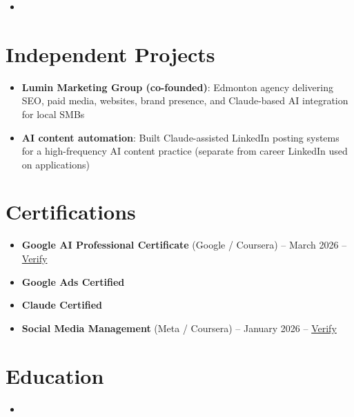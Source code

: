 \documentclass[11pt,a4paper,sans]{moderncv}
\begin{document}
\begin{itemize}
\item{}

\end{itemize}

\section{Independent Projects}
\vspace{1pt}
\begin{itemize}
\item \textbf{Lumin Marketing Group (co-founded)}: Edmonton agency delivering SEO, paid media, websites, brand presence, and Claude-based AI integration for local SMBs
\item \textbf{AI content automation}: Built Claude-assisted LinkedIn posting systems for a high-frequency AI content practice (separate from career LinkedIn used on applications)
\end{itemize}

\section{Certifications}
\vspace{1pt}
\begin{itemize}
\item \textbf{Google AI Professional Certificate} (Google / Coursera) -- March 2026 -- \href{https://www.coursera.org/account/accomplishments/verify/professional-cert/54E1P3RBHVL8}{Verify}
\item \textbf{Google Ads Certified}
\item \textbf{Claude Certified}
\item \textbf{Social Media Management} (Meta / Coursera) -- January 2026 -- \href{https://www.coursera.org/account/accomplishments/verify/7NOVGMU2L69G}{Verify}
\end{itemize}

\section{Education}
\vspace{1pt}
\begin{itemize}
\item{}
\end{itemize}
\end{document}
